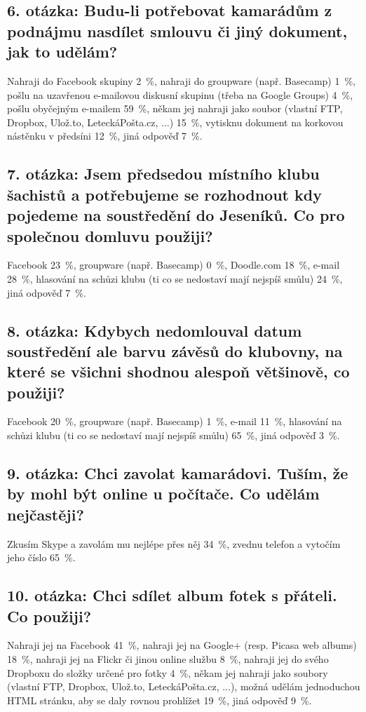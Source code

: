 \documentclass[12pt,oneside,final]{fithesis2}
\begin{document}
\subsection*{6. otázka: Budu-li potřebovat kamarádům z podnájmu nasdílet smlouvu či jiný dokument, jak to udělám?}
Nahraji do Facebook skupiny 2~\%,
nahraji do groupware (např. Basecamp) 1~\%,
pošlu na uzavřenou e-mailovou diskusní skupinu (třeba na Google Groups) 4~\%,
pošlu obyčejným e-mailem 59~\%,
někam jej nahraji jako soubor (vlastní FTP, Dropbox, Ulož.to, LeteckáPošta.cz, ...) 15~\%,
vytisknu dokument na korkovou nástěnku v předsíni 12~\%,
jiná odpověď 7~\%.

\subsection*{7. otázka: Jsem předsedou místního klubu šachistů a potřebujeme se rozhodnout kdy pojedeme na soustředění do Jeseníků. Co pro společnou domluvu použiji?}
Facebook 23~\%,
groupware (např. Basecamp) 0~\%,
Doodle.com 18~\%,
e-mail 28~\%,
hlasování na schůzi klubu (ti co se nedostaví mají nejspíš smůlu) 24~\%,
jiná odpověď 7~\%.

\subsection*{8. otázka: Kdybych nedomlouval datum soustředění ale barvu závěsů do klubovny, na které se všichni shodnou alespoň většinově, co použiji?}
Facebook 20~\%,
groupware (např. Basecamp) 1~\%,
e-mail 11~\%,
hlasování na schůzi klubu (ti co se nedostaví mají nejspíš smůlu) 65~\%,
jiná odpověď 3~\%.

\subsection*{9. otázka: Chci zavolat kamarádovi. Tuším, že by mohl být online u počítače. Co udělám nejčastěji?}
Zkusím Skype a zavolám mu nejlépe přes něj 34~\%,
zvednu telefon a vytočím jeho číslo 65~\%.

\subsection*{10. otázka: Chci sdílet album fotek s přáteli. Co použiji?}
Nahraji jej na Facebook 41~\%,
nahraji jej na Google+ (resp. Picasa web albums) 18~\%,
nahraji jej na Flickr či jinou online službu 8~\%,
nahraji jej do svého Dropboxu do složky určené pro fotky 4~\%,
někam jej nahraji jako soubory (vlastní FTP, Dropbox, Ulož.to, LeteckáPošta.cz, ...), možná udělám jednoduchou HTML stránku, aby se daly rovnou prohlížet 19~\%,
jiná odpověď 9~\%.
\end{document}
